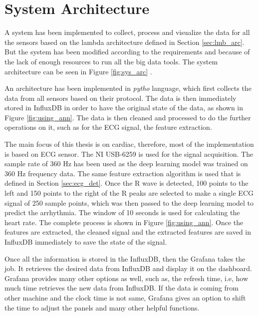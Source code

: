 \section{System Architecture}
A system has been implemented to collect, process and visualize the data for all the sensors based on the lambda architecture defined in Section \ref{sec:lmb_arc}. But the system has been modified according to the requirements and because of the lack of enough resources to run all the big data tools. The system architecture can be seen in Figure \ref{fig:sys_arc} .

An architecture has been implemented in \textit{pytho} language, which first collects the data from all sensors based on their protocol. The data is then immediately stored in InfluxDB in order to have the original state of the data, as shown in Figure \ref{fig:using_ann}. The data is then cleaned and processed to do the further operations on it, such as for the ECG signal, the feature extraction. 

The main focus of this thesis is on cardiac, therefore, most of the implementation is based on ECG sensor. The NI USB-6259 is used for the signal acquisition. The sample rate of 360 Hz has been used as the deep learning model was trained on 360 Hz frequency data. The same feature extraction algorithm is used that is defined in Section \ref{sec:ecg_det}. Once the R wave is detected, 100 points to the left and 150 points to the right of the R peaks are selected to make a single ECG signal of 250 sample points, which was then passed to the deep learning model to predict the arrhythmia. The window of 10 seconds is used for calculating the heart rate. The complete process is shown in Figure \ref{fig:using_ann}. Once the features are extracted, the cleaned signal and the extracted features are saved in InfluxDB immediately to save the state of the signal.

Once all the information is stored in the InfluxDB, then the Grafana takes the job. It retrieves the desired data from InfluxDB and display it on the dashboard. Grafana provides many other options as well, such as, the refresh time, i.e, how much time retrieves the new data from InfluxDB. If the data is coming from other machine and the clock time is not same, Grafana gives an option to shift the time to adjust the panels and many other helpful functions.


